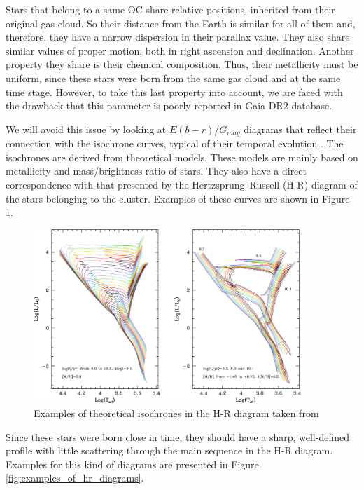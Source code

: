 \documentclass[11pt, a4paper, english]{book}
\begin{document}
Stars that belong to a same OC share relative positions, inherited from their original gas cloud.
So their distance from the Earth is similar for all of them and, therefore, they have a narrow dispersion in their parallax value.
They also share similar values of proper motion, both in right ascension and declination. Another property they share is their chemical composition.
Thus, their metallicity must be uniform, since these stars were born from the same gas cloud and at the same time stage.
However, to take this last property into account, we are faced with the drawback that this parameter is poorly reported in Gaia DR2 database.

We will avoid this issue by looking at $E(b-r) / G_{mag}$ diagrams that reflect their connection with the isochrone curves, typical of their
temporal evolution \cite{bressan2012parsec}. The isochrones are derived from theoretical models. These models are mainly based on metallicity
and mass/brightness ratio of stars. They also have a direct correspondence with that presented by the Hertzsprung–Russell (H-R) diagram of the
stars belonging to the cluster. Examples of these curves are shown in Figure \ref{fig:examples_of_isochrones}.

\begin{figure}[htbp]
  \centering
  \includegraphics[width=0.9\textwidth]{../figures/theoretical_isochrones_in_hr_diagrams.pdf}
  \caption{Examples of theoretical isochrones in the H-R diagram taken from \protect{}}
  \label{fig:examples_of_isochrones}
\end{figure}

Since these stars were born close in time, they should have a sharp, well-defined profile with little scattering through the main sequence in the H-R diagram.
Examples for this kind of diagrams are presented in Figure \ref{fig:examples_of_hr_diagrams}.
\end{document}
